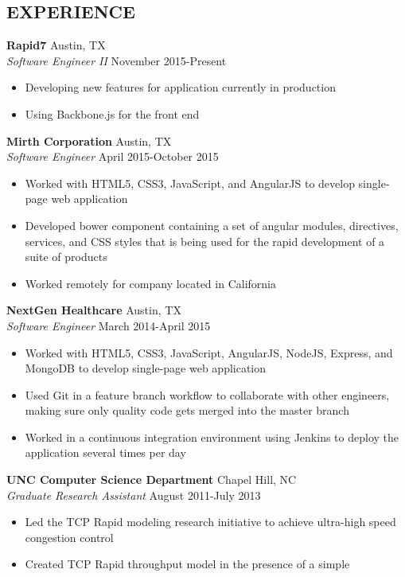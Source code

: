 \documentclass[line,margin,letterpaper]{res}
\begin{document}
\begin{resume}
\section{EXPERIENCE}
  {\bf Rapid7} \hfill Austin, TX \\
  \emph{Software Engineer II} \hfill November 2015-Present
  \begin{itemize} \itemsep -2pt
    \item Developing new features for application currently in production
    \item Using Backbone.js for the front end
  \end{itemize}
  {\bf Mirth Corporation} \hfill Austin, TX \\
  \emph{Software Engineer} \hfill April 2015-October 2015
  \begin{itemize} \itemsep -2pt
    \item Worked with HTML5, CSS3, JavaScript, and AngularJS to develop
    single-page web application
    \item Developed bower component containing a set of angular modules,
    directives, services, and CSS styles that is being used for the rapid
    development of a suite of products
    \item Worked remotely for company located in California
  \end{itemize}
  {\bf NextGen Healthcare} \hfill Austin, TX \\
  \emph{Software Engineer} \hfill March 2014-April 2015
  \begin{itemize} \itemsep -2pt
    \item Worked with HTML5, CSS3, JavaScript, AngularJS, NodeJS, Express, and
    MongoDB to develop single-page web application
    \item Used Git in a feature branch workflow to collaborate with other
    engineers, making sure only quality code gets merged into the master branch
    \item Worked in a continuous integration environment using Jenkins to
    deploy the application several times per day
  \end{itemize}
  {\bf UNC Computer Science Department} \hfill Chapel Hill, NC \\
  \emph{Graduate Research Assistant} \hfill August 2011-July 2013
  \begin{itemize} \itemsep -2pt
    \item Led the TCP Rapid modeling research initiative to achieve 
    ultra-high speed congestion control
    \item Created TCP Rapid throughput model in the presence of a simple 

\end{itemize}
\end{resume}
\end{document}
